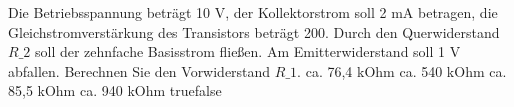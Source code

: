     {Die Betriebsspannung beträgt 10 V, der Kollektorstrom soll 2 mA betragen, die Gleichstromverstärkung des Transistors beträgt 200. Durch den Querwiderstand $R\_2$ soll der zehnfache Basisstrom fließen. Am Emitterwiderstand soll 1 V abfallen. Berechnen Sie den Vorwiderstand $R\_1$.}
    {ca. 76,4 kOhm}
    {ca. 540 kOhm}
    {ca. 85,5 kOhm}
    {ca. 940 kOhm}
    {true}{false}